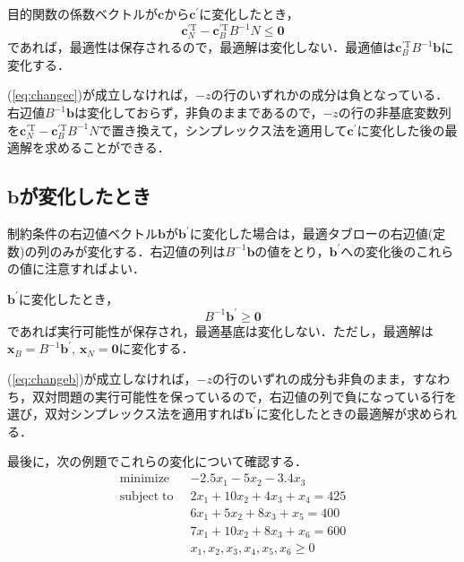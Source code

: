 \documentclass{jsreport}
\begin{document}
目的関数の係数ベクトルが$\bm{c}$から$\bm{c}^{\prime}$に変化したとき，
\begin{equation}\label{eq:changec}
  \bm{c}_N^{\prime \mathrm{T}} - \bm{c}_B^{\prime \mathrm{T}} B^{-1} N \leq \bm{0}
\end{equation}
であれば，最適性は保存されるので，最適解は変化しない．最適値は$\bm{c}_B^{\prime \mathrm{T}} B^{-1} \bm{b}$に変化する．

(\ref{eq:changec})が成立しなければ，$-z$の行のいずれかの成分は負となっている．右辺値$B^{-1}\bm{b}$は変化しておらず，非負のままであるので，$-z$の行の非基底変数列を$\bm{c}_N^{\prime \mathrm{T}} - \bm{c}_B^{\prime \mathrm{T}} B^{-1} N$で置き換えて，シンプレックス法を適用して$\bm{c}^{\prime}$に変化した後の最適解を求めることができる．


\subsection{$\bm{b}$が変化したとき}
制約条件の右辺値ベクトル$\bm{b}$が$\bm{b}^{\prime}$に変化した場合は，最適タブローの右辺値(定数)の列のみが変化する．右辺値の列は$B^{-1}\bm{b}$の値をとり，$\bm{b}^{\prime}$への変化後のこれらの値に注意すればよい．

$\bm{b}^{\prime}$に変化したとき，
\begin{equation}\label{eq:changeb}
  B^{-1}\bm{b}^{\prime} \geq \bm{0}
\end{equation}
であれば実行可能性が保存され，最適基底は変化しない．ただし，最適解は$\bm{x}_B = B^{-1}\bm{b}^{\prime}, \, \bm{x}_N = \bm{0}$に変化する．

(\ref{eq:changeb})が成立しなければ，$-z$の行のいずれの成分も非負のまま，すなわち，双対問題の実行可能性を保っているので，右辺値の列で負になっている行を選び，双対シンプレックス法を適用すれば$\bm{b}^{\prime}$に変化したときの最適解が求められる．


最後に，次の例題でこれらの変化について確認する．
\begin{align}
  \mathrm{minimize} \; \; &-2.5x_1 - 5x_2 - 3.4 x_3 \nonumber \\
  \mathrm{subject \; to} \; \; &2x_1 + 10x_2 + 4x_3 + x_4 = 425 \nonumber \\
  &6x_1 + 5x_2 + 8x_3 + x_5 = 400 \nonumber \\
  &7x_1 + 10x_2 + 8x_3 + x_6 = 600 \nonumber \\
  &x_1, x_2, x_3, x_4, x_5, x_6 \geq 0 \nonumber
\end{align}
\end{document}
